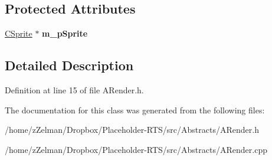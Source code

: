 \subsection*{Protected Attributes}
\begin{DoxyCompactItemize}
\item 
\hypertarget{classARenderable_a6030df923c81b400e94ff1f6a9df41f8}{\hyperlink{classCSprite}{C\-Sprite} $\ast$ {\bfseries m\-\_\-p\-Sprite}}\label{classARenderable_a6030df923c81b400e94ff1f6a9df41f8}

\end{DoxyCompactItemize}


\subsection{Detailed Description}


Definition at line 15 of file A\-Render.\-h.



The documentation for this class was generated from the following files\-:\begin{DoxyCompactItemize}
\item 
/home/z\-Zelman/\-Dropbox/\-Placeholder-\/\-R\-T\-S/src/\-Abstracts/A\-Render.\-h\item 
/home/z\-Zelman/\-Dropbox/\-Placeholder-\/\-R\-T\-S/src/\-Abstracts/A\-Render.\-cpp\end{DoxyCompactItemize}
